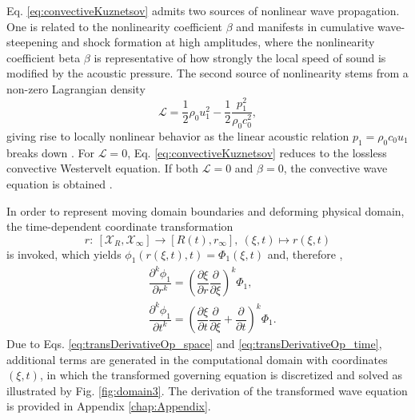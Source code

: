 Eq. \eqref{eq:convectiveKuznetsov} admits two sources of nonlinear wave propagation. One is related to the nonlinearity coefficient $\beta$ and manifests in cumulative wave-steepening and shock formation at high amplitudes, where the nonlinearity coefficient beta $\beta$ is representative of how strongly the local speed of sound is modified by the acoustic pressure. The second source of nonlinearity stems from a non-zero Lagrangian density \citep{Zhong_et_al_2021}
\begin{equation}
    \mathcal{L} = \dfrac{1}{2}\rho_0u_1^2 - \dfrac{1}{2}\dfrac{p_1^2}{\rho_0 c_0^2}
    \label{eq:LagrangianDensity},
\end{equation}
giving rise to locally nonlinear behavior as the linear acoustic relation $p_1 = \rho_0 c_0 u_1$ breaks down \citep{Cervenka_and_Bednarik_2022}. For $\mathcal{L}=0$, Eq. \eqref{eq:convectiveKuznetsov} reduces to the lossless convective Westervelt equation. If both $\mathcal{L}=0$ and $\beta=0$, the convective wave equation is obtained \citep{Pierce_1990, Kaltenbacher_and_Hueppe_2018}.

In order to represent moving domain boundaries and deforming physical domain, the time-dependent coordinate transformation
\begin{equation}
    r: \: \left[\mathcal{X}_R,\mathcal{X}_{\infty}\right]
    \rightarrow \left[R\left(t\right),r_{\infty}\right], \: \left(\xi,t\right) \mapsto r\left(\xi,t\right)
    \label{eq:coordTrans}
\end{equation}
is invoked, which yields
$\phi_1\left(r\left(\xi,t\right),t\right)=\Phi_1\left(\xi,t\right)$ and, therefore \citep{Schenke_et_al_2022},
\begin{align}
     & \dfrac{\partial^k \phi_1}{\partial r^k} = \left(\dfrac{\partial \xi}{\partial r} \dfrac{\partial}{\partial \xi}\right)^k\Phi_1,
    \label{eq:transDerivativeOp_space}                                                                                                                                \\
     & \dfrac{\partial^k \phi_1}{\partial t^k} = \left(\dfrac{\partial \xi}{\partial t} \dfrac{\partial}{\partial \xi} + \dfrac{\partial}{\partial t}\right)^k\Phi_1.
    \label{eq:transDerivativeOp_time}
\end{align}
Due to Eqs. \eqref{eq:transDerivativeOp_space} and \eqref{eq:transDerivativeOp_time}, additional terms are generated in the computational domain with coordinates $\left(\xi, t\right)$, in which the transformed governing equation is discretized and solved as illustrated by Fig. \ref{fig:domain3}. The derivation of the transformed wave equation is provided in Appendix \ref{chap:Appendix}.

